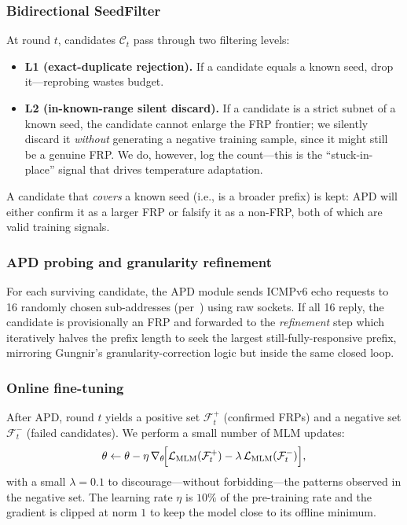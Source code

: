 \documentclass[conference]{IEEEtran}
\begin{document}
\subsubsection{Bidirectional SeedFilter}
At round $t$, candidates $\mathcal C_t$ pass through two filtering
levels:
\begin{itemize}
\item \textbf{L1 (exact-duplicate rejection).}  If a candidate equals a
      known seed, drop it---reprobing wastes budget.
\item \textbf{L2 (in-known-range silent discard).}  If a candidate is
      a strict subnet of a known seed, the candidate cannot enlarge
      the FRP frontier; we silently discard it \emph{without}
      generating a negative training sample, since it might still be a
      genuine FRP.  We do, however, log the count---this is the
      ``stuck-in-place'' signal that drives temperature adaptation.
\end{itemize}
A candidate that \emph{covers} a known seed (i.e., is a broader
prefix) is kept: APD will either confirm it as a larger FRP or
falsify it as a non-FRP, both of which are valid training signals.

\subsubsection{APD probing and granularity refinement}
For each surviving candidate, the APD module sends ICMPv6 echo
requests to 16 randomly chosen sub-addresses
(per~\cite{gasser2018clusters}) using raw sockets.  If all 16 reply,
the candidate is provisionally an FRP and forwarded to the
\emph{refinement} step which iteratively halves the prefix length to
seek the largest still-fully-responsive prefix, mirroring Gungnir's
granularity-correction logic but inside the same closed loop.

\subsubsection{Online fine-tuning}
After APD, round $t$ yields a positive set $\mathcal F_t^{+}$
(confirmed FRPs) and a negative set $\mathcal F_t^{-}$ (failed
candidates).  We perform a small number of MLM updates:
\begin{equation}
  \theta \leftarrow \theta - \eta\,\nabla_\theta\!\Bigl[
    \mathcal L_{\mathrm{MLM}}(\mathcal F_t^{+})
   -\lambda\,\mathcal L_{\mathrm{MLM}}(\mathcal F_t^{-})\Bigr],
\end{equation}
with a small $\lambda{=}0.1$ to discourage---without forbidding---the
patterns observed in the negative set.  The learning rate $\eta$ is
$10\%$ of the pre-training rate and the gradient is clipped at norm
$1$ to keep the model close to its offline minimum.
\end{document}
